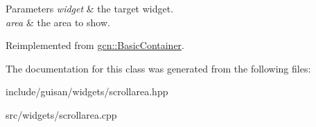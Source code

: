 \begin{DoxyParams}{Parameters}
{\em widget} & the target widget. \\
\hline
{\em area} & the area to show. \\
\hline
\end{DoxyParams}


Reimplemented from \hyperlink{classgcn_1_1BasicContainer_a5843702859ccb407f308cbe5d8987d28}{gcn\+::\+Basic\+Container}.



The documentation for this class was generated from the following files\+:\begin{DoxyCompactItemize}
\item 
include/guisan/widgets/scrollarea.\+hpp\item 
src/widgets/scrollarea.\+cpp\end{DoxyCompactItemize}
